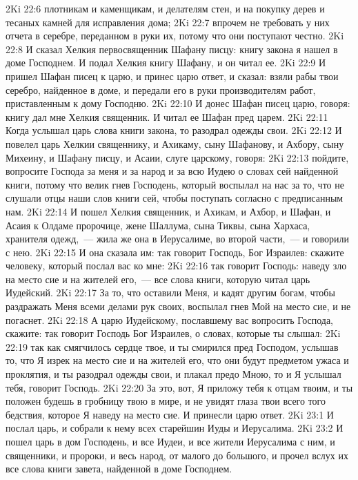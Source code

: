 \vs 2Ki 22:6 плотникам и каменщикам, и делателям стен, и на покупку дерев и тесаных камней для исправления дома;
\vs 2Ki 22:7 впрочем не требовать у них отчета в серебре, переданном в руки их, потому что они поступают честно.
\rsbpar\vs 2Ki 22:8 И сказал Хелкия первосвященник Шафану писцу: книгу закона я нашел в доме Господнем. И подал Хелкия книгу Шафану, и он читал ее.
\vs 2Ki 22:9 И пришел Шафан писец к царю, и принес царю ответ, и сказал: взяли рабы твои серебро, найденное в доме, и передали его в руки производителям работ, приставленным к дому Господню.
\vs 2Ki 22:10 И донес Шафан писец царю, говоря: книгу дал мне Хелкия священник. И читал ее Шафан пред царем.
\vs 2Ki 22:11 Когда услышал царь слова книги закона, то разодрал одежды свои.
\vs 2Ki 22:12 И повелел царь Хелкии священнику, и Ахикаму, сыну Шафанову, и Ахбору, сыну Михеину, и Шафану писцу, и Асаии, слуге царскому, говоря:
\vs 2Ki 22:13 пойдите, вопросите Господа за меня и за народ и за всю Иудею о словах сей найденной книги, потому что велик гнев Господень, который воспылал на нас за то, что не слушали отцы наши слов книги сей, чтобы поступать согласно с предписанным нам.
\vs 2Ki 22:14 И пошел Хелкия священник, и Ахикам, и Ахбор, и Шафан, и Асаия к Олдаме пророчице, жене Шаллума, сына Тиквы, сына Хархаса, хранителя одежд,~--- жила же она в Иерусалиме, во второй части,~--- и говорили с нею.
\vs 2Ki 22:15 И она сказала им: так говорит Господь, Бог Израилев: скажите человеку, который послал вас ко мне:
\vs 2Ki 22:16 так говорит Господь: наведу зло на место сие и на жителей его,~--- все слова книги, которую читал царь Иудейский.
\vs 2Ki 22:17 За то, что оставили Меня, и кадят другим богам, чтобы раздражать Меня всеми делами рук своих, воспылал гнев Мой на место сие, и не погаснет.
\vs 2Ki 22:18 А царю Иудейскому, пославшему вас вопросить Господа, скажите: так говорит Господь Бог Израилев, о словах, которые ты слышал:
\vs 2Ki 22:19 так как смягчилось сердце твое, и ты смирился пред Господом, услышав то, что Я изрек на место сие и на жителей его, что они будут предметом ужаса и проклятия, и ты разодрал одежды свои, и плакал предо Мною, то и Я услышал тебя, говорит Господь.
\vs 2Ki 22:20 За это, вот, Я приложу тебя к отцам твоим, и ты положен будешь в гробницу твою в мире, и не увидят глаза твои всего того бедствия, которое Я наведу на место сие. И принесли царю ответ.
\vs 2Ki 23:1 И послал царь, и собрали к нему всех старейшин Иуды и Иерусалима.
\vs 2Ki 23:2 И пошел царь в дом Господень, и все Иудеи, и все жители Иерусалима с ним, и священники, и пророки, и весь народ, от малого до большого, и прочел вслух их все слова книги завета, найденной в доме Господнем.
